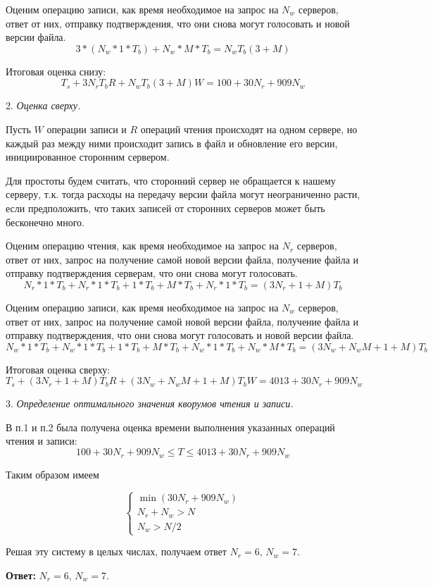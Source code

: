 Оценим операцию записи, как время необходимое на запрос на $N_w$ серверов,
ответ от них, отправку подтверждения, что они снова могут голосовать и новой
версии файла.
$$
3*(N_w * 1 * T_b) + N_w*M*T_b = N_wT_b(3 + M)
$$

Итоговая оценка снизу:
$$
T_s + 3N_rT_bR + N_wT_b(3 + M)W = 100 + 30N_r + 909N_w
$$

2. \textit{Оценка сверху.}

Пусть $W$ операции записи и $R$ операций чтения происходят на одном сервере, но
каждый раз между ними происходит запись в файл и обновление его версии,
инициированное сторонним сервером.

Для простоты будем считать, что сторонний сервер не обращается к нашему
серверу, т.к. тогда расходы на передачу версии файла могут неограниченно расти,
если предположить, что таких записей от сторонних серверов может быть
бесконечно много.

Оценим операцию чтения, как время необходимое на запрос на $N_r$ серверов,
ответ от них, запрос на получение самой новой версии файла, получение файла и
отправку подтверждения серверам, что они снова могут голосовать.
$$
N_r*1*T_b + N_r*1*T_b + 1*T_b + M*T_b + N_r*1*T_b = (3N_r + 1 + M)T_b
$$

Оценим операцию записи, как время необходимое на запрос на $N_w$ серверов,
ответ от них, запрос на получение самой новой версии файла, получение файла и
отправку подтверждения, что они снова могут голосовать и новой версии файла.
$$
N_w*1*T_b + N_w*1*T_b + 1*T_b + M*T_b + N_w*1*T_b + N_w*M*T_b = (3N_w + N_wM + 1 + M)T_b
$$

Итоговая оценка сверху:
$$
T_s + (3N_r + 1 + M)T_bR + (3N_w + N_wM + 1 + M)T_bW = 4013 + 30N_r + 909N_w
$$

3. \textit{Определение оптимального значения кворумов чтения и записи.}

В п.1 и п.2 была получена оценка времени выполнения указанных операций чтения и
записи:
$$
100 + 30N_r + 909N_w \le T \le 4013 + 30N_r + 909N_w
$$

Таким образом имеем

$$
\begin{cases}
    \min (30N_r + 909N_w)\\
    N_r + N_w > N\\
    N_w > N / 2
\end{cases}
$$

Решая эту систему в целых числах, получаем ответ $N_r = 6$, $N_w = 7$.

\textbf{Ответ:} $N_r = 6$, $N_w = 7$.
